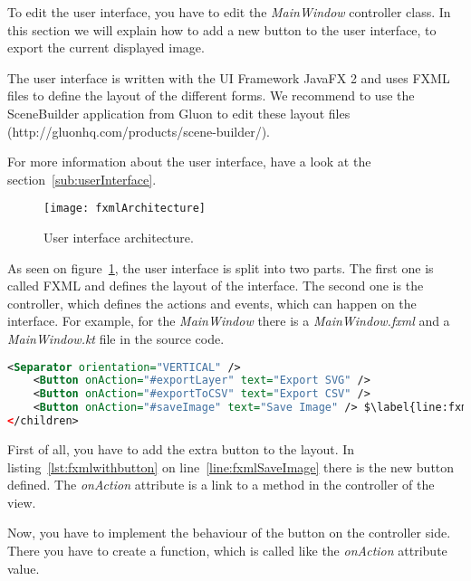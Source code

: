 To edit the user interface, you have to edit the \textit{MainWindow} controller class. In this section we will explain how to add a new button to the user interface, to export the current displayed image.

The user interface is written with the UI Framework JavaFX 2 and uses FXML files to define the layout of the different forms. We recommend to use the SceneBuilder application from Gluon to edit these layout files (http://gluonhq.com/products/scene-builder/).

For more information about the user interface, have a look at the section~\ref{sub:userInterface}.

\begin{figure}[H]
	\centering
	\texttt{[image: fxmlArchitecture]}
	\caption{User interface architecture.}
	\label{fig:fxmlArchitecture}
\end{figure}

As seen on figure~\ref{fig:fxmlArchitecture}, the user interface is split into two parts. The first one is called FXML and defines the layout of the interface. The second one is the controller, which defines the actions and events, which can happen on the interface. For example, for the \textit{MainWindow} there is a \textit{MainWindow.fxml} and a \textit{MainWindow.kt} file in the source code.

\begin{lstlisting}[caption={MainWindow.fxml with new button.}, label={lst:fxmlwithbutton}, language=XML, escapechar=$]
    <Separator orientation="VERTICAL" />
    <Button onAction="#exportLayer" text="Export SVG" />
    <Button onAction="#exportToCSV" text="Export CSV" />
    <Button onAction="#saveImage" text="Save Image" /> $\label{line:fxmlSaveImage}$
</children>
\end{lstlisting}

First of all, you have to add the extra button to the layout. In listing~\ref{lst:fxmlwithbutton} on line~\ref{line:fxmlSaveImage} there is the new button defined. The \textit{onAction} attribute is a link to a method in the controller of the view.

Now, you have to implement the behaviour of the button on the controller side. There you have to create a function, which is called like the \textit{onAction} attribute value.


